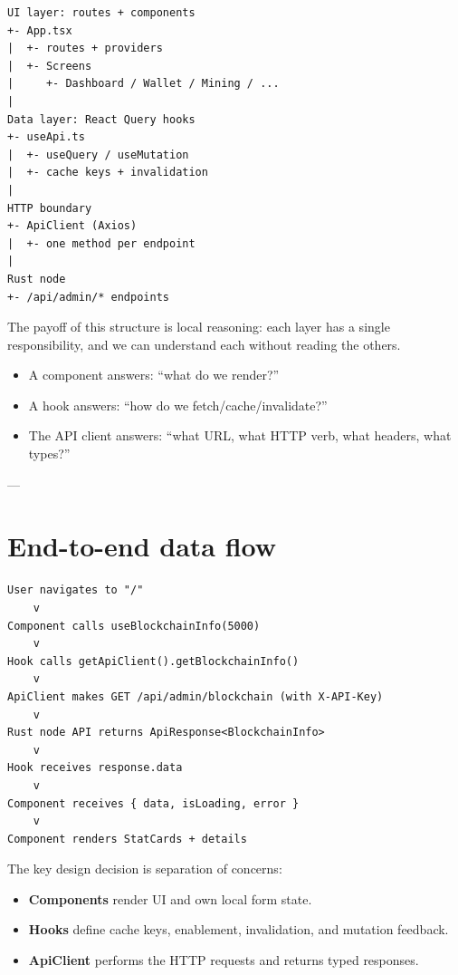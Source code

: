 \begin{verbatim}
UI layer: routes + components
+- App.tsx
|  +- routes + providers
|  +- Screens
|     +- Dashboard / Wallet / Mining / ...
|
Data layer: React Query hooks
+- useApi.ts
|  +- useQuery / useMutation
|  +- cache keys + invalidation
|
HTTP boundary
+- ApiClient (Axios)
|  +- one method per endpoint
|
Rust node
+- /api/admin/* endpoints
\end{verbatim}

The payoff of this structure is local reasoning: each layer has a single responsibility, and we can understand each without reading the others.

\begin{itemize}
  \item A component answers: ``what do we render?''
  \item A hook answers: ``how do we fetch/cache/invalidate?''
  \item The API client answers: ``what URL, what HTTP verb, what headers, what types?''
\end{itemize}

---

\section{End-to-end data flow}
\label{sec:data-flow}

\begin{verbatim}
User navigates to "/"
    v
Component calls useBlockchainInfo(5000)
    v
Hook calls getApiClient().getBlockchainInfo()
    v
ApiClient makes GET /api/admin/blockchain (with X-API-Key)
    v
Rust node API returns ApiResponse<BlockchainInfo>
    v
Hook receives response.data
    v
Component receives { data, isLoading, error }
    v
Component renders StatCards + details
\end{verbatim}

The key design decision is separation of concerns:

\begin{itemize}
  \item \textbf{Components} render UI and own local form state.
  \item \textbf{Hooks} define cache keys, enablement, invalidation, and mutation feedback.
  \item \textbf{ApiClient} performs the HTTP requests and returns typed responses.
\end{itemize}

